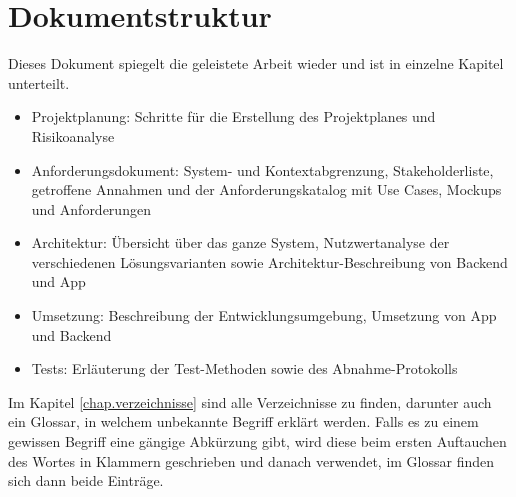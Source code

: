 \section{Dokumentstruktur}\label{nicht_ziele}
Dieses Dokument spiegelt die geleistete Arbeit wieder und ist in einzelne Kapitel unterteilt.
\begin{itemize}
\item Projektplanung: Schritte für die Erstellung des Projektplanes und Risikoanalyse
\item Anforderungsdokument: System- und Kontextabgrenzung, Stakeholderliste, getroffene Annahmen und der Anforderungskatalog mit Use Cases, Mockups und Anforderungen
\item Architektur: Übersicht über das ganze System, Nutzwertanalyse der verschiedenen Lösungsvarianten sowie Architektur-Beschreibung von Backend und App
\item Umsetzung: Beschreibung der Entwicklungsumgebung, Umsetzung von App und Backend
\item Tests: Erläuterung der Test-Methoden sowie des Abnahme-Protokolls
\end{itemize}

Im Kapitel \ref{chap.verzeichnisse} sind alle Verzeichnisse zu finden, darunter auch ein Glossar, in welchem unbekannte Begriff erklärt werden. Falls es zu einem gewissen Begriff eine gängige Abkürzung gibt, wird diese beim ersten Auftauchen des Wortes in Klammern geschrieben und danach verwendet, im Glossar finden sich dann beide Einträge.
